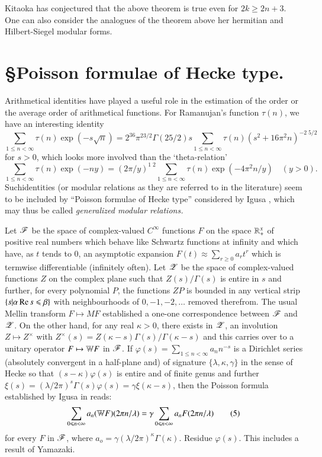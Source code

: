 Kitaoka \cite{art7-KI} has conjectured that the above theorem is true even for $2k \geqslant 2n +3 $. One can also consider the analogues of the theorem above her hermitian and Hilbert-Siegel modular forms. 

\section*{\S Poisson formulae of Hecke type.} 
Arithmetical identities have played a useful role in the estimation of the order or the average order of arithmetical functions. For Ramanujan's function $\tau(n)$, we have an interesting identity
$$
\sum\limits_{1\leqslant n <\infty} \tau (n) \exp (-s\sqrt{n}) = 2^{36} \pi^{23/2} \Gamma (25/2) s \sum\limits_{1 \leqslant n < \infty} \tau (n) (s^2 + 16 \pi^2n)^{-2 \;5/2} 
$$
for $s > 0$, which looks more involved than the `theta-relation'
$$
\sum\limits_{1 \leqslant n <\infty} \tau(n) \exp (-ny) = (2 \pi /y)^{1\; 2} \sum\limits_{1 \leqslant n < \infty} \tau (n) \exp (-4 \pi^2 n /y) \quad (y > 0).
$$ 
Such\pageoriginale identities (or modular relations as they are referred to in the literature) seem to be included by ``Poisson formulae of Hecke type'' considered by Igusa \cite{art7-I}, which may thus be called \textit{generalized modular relations.}

Let $\mathscr{F}$ be the space of complex-valued $C^\infty$ functions $F$ on the space $\mathbb{R}^x_+$ of positive real numbers which behave like Schwartz functions at infinity and which have, as $t$ tends to $0$, an asymptotic expansion $F(t) \approx \sum\limits_{r \geqslant 0} a_r t^r$ which is termwise differentiable (infinitely often). Let $\mathscr{Z}$ be the space of complex-valued functions $Z$ on the complex plane such that $Z(s)/\Gamma (s)$ is entire in $s$ and further, for every polynomial $P$, the functions $ZP$ is bounded in any vertical strip $\{s|\alpha \operatorname{Re} s \leqslant \beta\}$ with neighbourhoods of $0, -1, -2, \ldots$ removed therefrom. The usual Mellin transform $F \mapsto M F$ established a one-one correspondence between $\mathscr{F}$ and $\mathscr{Z}$. On the other hand, for any real $\kappa > 0$, there exists in $\mathscr{Z}$, an involution $Z \mapsto Z^\times$ with $Z^\times (s) = Z (\kappa -s)\Gamma (s) / \Gamma (\kappa -s)$ and this carries over to a unitary operator $F \mapsto \mathbb{W} F$ in $\mathscr{F}$. If $\varphi (s) = \sum\limits_{1 \leqslant n < \infty} a_n n^{-s}$ is a Dirichlet series  (absolutely convergent in a half-plane and) of signature $\{\lambda, \kappa, \gamma\}$ in the sense of Hecke \cite{art7-H2} so that $(s -\kappa) \varphi (s)$ is entire and of finite genus and further $\xi (s) =(\lambda / 2 \pi)^s \Gamma (s) \varphi (s) = \gamma \xi (\kappa -s)$, then the Poisson formula established by Igusa in \cite{art7-I} reads:
\begin{equation*}
\sum\limits_{0\leqslant n < \infty} a_n (\mathbb{W} F)(2 \pi n /\lambda) = \gamma \sum\limits_{0 \leqslant n < \infty} a_n F (2 \pi n /\lambda)\tag{5} \label{art7-eq5}
\end{equation*}
for every $F$ in $\mathscr{F}$, where $a_o = \gamma (\lambda/ 2 \pi)^\kappa \Gamma (\kappa)$. Residue $\varphi (s)$. This includes a result of Yamazaki.

